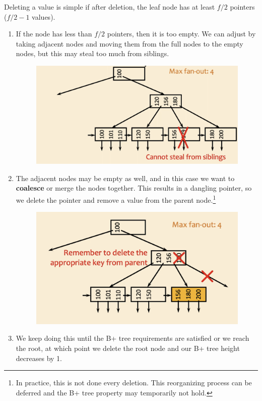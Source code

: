 \documentclass{article}
\begin{document}
    \begin{definition}[Deletion]
      Deleting a value is simple if after deletion, the leaf node has at least $f/2$ pointers ($f/2 - 1$ values). 
      
      \begin{enumerate}
        \item If the node has less than $f/2$ pointers, then it is too empty. We can adjust by taking adjacent nodes and moving them from the full nodes to the empty nodes, but this may steal too much from siblings. 

        \begin{figure}[H]
          \centering 
          \includegraphics[scale=0.4]{img/deletion_1.png}
          \caption{} 
          \label{fig:deletion_1}
        \end{figure}

        \item The adjacent nodes may be empty as well, and in this case we want to \textbf{coalesce} or merge the nodes together. This results in a dangling pointer, so we delete the pointer and remove a value from the parent node.\footnote{In practice, this is not done every deletion. This reorganizing process can be deferred and the B+ tree property may temporarily not hold.} 

        \begin{figure}[H]
          \centering 
          \includegraphics[scale=0.4]{img/deletion_2.png}
          \caption{} 
          \label{fig:deletion_2}
        \end{figure}

        \item We keep doing this until the B+ tree requirements are satisfied or we reach the root, at which point we delete the root node and our B+ tree height decreases by 1. 
      \end{enumerate}
    \end{definition}
\end{document}
